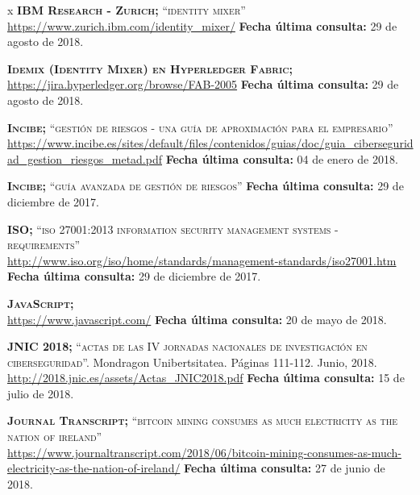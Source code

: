\begin{thebibliography} {x}
	\textsc{\textbf{IBM Research - Zurich; }} \textsc{“identity mixer”} \\
	\url{https://www.zurich.ibm.com/identity_mixer/} 
	\newline \textbf{Fecha última consulta:} 29 de agosto de 2018.
	
	 \textsc{\textbf{Idemix (Identity Mixer) en Hyperledger Fabric; }} \\ 
	\url{https://jira.hyperledger.org/browse/FAB-2005} 
	\newline \textbf{Fecha última consulta:} 29 de agosto de 2018.
		
	 \textsc{\textbf{Incibe; }}\textsc{“gestión de riesgos - una guía de aproximación para el empresario”} \\
	\url{https://www.incibe.es/sites/default/files/contenidos/guias/doc/guia_ciberseguridad_gestion_riesgos_metad.pdf}
	\newline \textbf{Fecha última consulta:} 04 de enero de 2018.
		
	 \textsc{\textbf{Incibe; }}\textsc{“guía avanzada de gestión de riesgos”}
	\newline \textbf{Fecha última consulta:} 29 de diciembre de 2017.
		
	 \textsc{\textbf{ISO; }}\textsc{“iso 27001:2013 information security management systems - requirements”} \\
	\url{http://www.iso.org/iso/home/standards/management-standards/iso27001.htm}
	\newline \textbf{Fecha última consulta:} 29 de diciembre de 2017.
		
	 \textsc{\textbf{JavaScript; }} \\ 
	\url{https://www.javascript.com/}
	\newline \textbf{Fecha última consulta:} 20 de mayo de 2018.
		
	 \textsc{\textbf{JNIC 2018; }}\textsc{“actas de las IV jornadas nacionales de investigación en ciberseguridad”.} Mondragon Unibertsitatea. Páginas 111-112. Junio, 2018. \\
	\url{http://2018.jnic.es/assets/Actas_JNIC2018.pdf}
	\newline \textbf{Fecha última consulta:} 15 de julio de 2018.
	
	 \textsc{\textbf{Journal Transcript; }}\textsc{“bitcoin mining consumes as much electricity as the nation of ireland”} \\ 
	\url{https://www.journaltranscript.com/2018/06/bitcoin-mining-consumes-as-much-electricity-as-the-nation-of-ireland/}
	\newline \textbf{Fecha última consulta:} 27 de junio de 2018.
	

\end{thebibliography}
